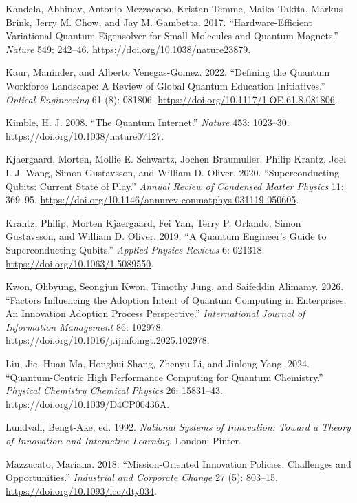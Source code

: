 \documentclass[
  11pt,
  letterpaper,
]{article}
\newlength{\cslhangindent}
\newenvironment{CSLReferences}[2] %
 {\begin{list}{}{%
  \setlength{\itemindent}{0pt}
  \setlength{\leftmargin}{0pt}
  \setlength{\parsep}{0pt}
  \ifodd #1
   \setlength{\leftmargin}{\cslhangindent}
   \setlength{\itemindent}{-1\cslhangindent}
  \fi
  \setlength{\itemsep}{#2\baselineskip}}}
 {\end{list}}
\begin{document}
\begin{CSLReferences}{1}{0}
Kandala, Abhinav, Antonio Mezzacapo, Kristan Temme, Maika Takita, Markus
Brink, Jerry M. Chow, and Jay M. Gambetta. 2017. {``Hardware-Efficient
Variational Quantum Eigensolver for Small Molecules and Quantum
Magnets.''} \emph{Nature} 549: 242--46.
\url{https://doi.org/10.1038/nature23879}.

Kaur, Maninder, and Alberto Venegas-Gomez. 2022. {``Defining the Quantum
Workforce Landscape: A Review of Global Quantum Education
Initiatives.''} \emph{Optical Engineering} 61 (8): 081806.
\url{https://doi.org/10.1117/1.OE.61.8.081806}.

Kimble, H. J. 2008. {``The Quantum Internet.''} \emph{Nature} 453:
1023--30. \url{https://doi.org/10.1038/nature07127}.

Kjaergaard, Morten, Mollie E. Schwartz, Jochen Braumuller, Philip
Krantz, Joel I.-J. Wang, Simon Gustavsson, and William D. Oliver. 2020.
{``Superconducting Qubits: Current State of Play.''} \emph{Annual Review
of Condensed Matter Physics} 11: 369--95.
\url{https://doi.org/10.1146/annurev-conmatphys-031119-050605}.

Krantz, Philip, Morten Kjaergaard, Fei Yan, Terry P. Orlando, Simon
Gustavsson, and William D. Oliver. 2019. {``A Quantum Engineer's Guide
to Superconducting Qubits.''} \emph{Applied Physics Reviews} 6: 021318.
\url{https://doi.org/10.1063/1.5089550}.

Kwon, Ohbyung, Seongjun Kwon, Timothy Jung, and Saifeddin Alimamy. 2026.
{``Factors Influencing the Adoption Intent of Quantum Computing in
Enterprises: An Innovation Adoption Process Perspective.''}
\emph{International Journal of Information Management} 86: 102978.
\url{https://doi.org/10.1016/j.ijinfomgt.2025.102978}.

Liu, Jie, Huan Ma, Honghui Shang, Zhenyu Li, and Jinlong Yang. 2024.
{``Quantum-Centric High Performance Computing for Quantum Chemistry.''}
\emph{Physical Chemistry Chemical Physics} 26: 15831--43.
\url{https://doi.org/10.1039/D4CP00436A}.

Lundvall, Bengt-Ake, ed. 1992. \emph{National Systems of Innovation:
Toward a Theory of Innovation and Interactive Learning}. London: Pinter.

Mazzucato, Mariana. 2018. {``Mission-Oriented Innovation Policies:
Challenges and Opportunities.''} \emph{Industrial and Corporate Change}
27 (5): 803--15. \url{https://doi.org/10.1093/icc/dty034}.


\end{CSLReferences}
\end{document}
